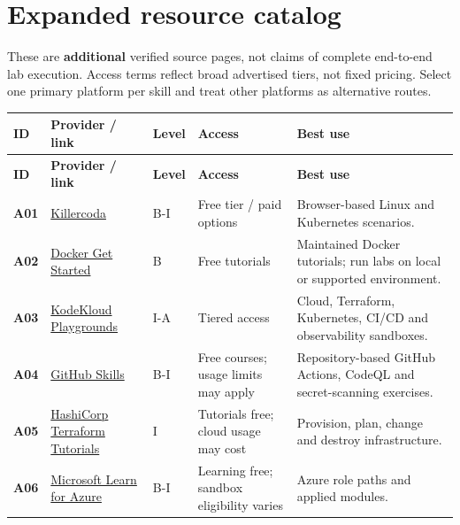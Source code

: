 \documentclass[10pt,letterpaper,oneside]{article}
\begin{document}
\section{Expanded resource catalog}
These are \textbf{additional} verified source pages, not claims of complete end-to-end lab execution. Access terms reflect broad advertised tiers, not fixed pricing. Select one primary platform per skill and treat other platforms as alternative routes.
\small
\begin{longtable}{@{}>{\raggedright\arraybackslash}p{\dimexpr 0.08671\dimexpr\linewidth-8\tabcolsep\relax\relax}>{\raggedright\arraybackslash}p{\dimexpr 0.24855\dimexpr\linewidth-8\tabcolsep\relax\relax}>{\raggedright\arraybackslash}p{\dimexpr 0.09827\dimexpr\linewidth-8\tabcolsep\relax\relax}>{\raggedright\arraybackslash}p{\dimexpr 0.16763\dimexpr\linewidth-8\tabcolsep\relax\relax}>{\raggedright\arraybackslash}p{\dimexpr 0.39884\dimexpr\linewidth-8\tabcolsep\relax\relax}@{}}
\toprule
\textbf{ID} & \textbf{Provider / link} & \textbf{Level} & \textbf{Access} & \textbf{Best use}\\\midrule\endfirsthead
\toprule\textbf{ID}&\textbf{Provider / link}&\textbf{Level}&\textbf{Access}&\textbf{Best use}\\\midrule\endhead
\bottomrule\endfoot
\textbf{A01} & \href{https://killercoda.com/}{Killercoda} & B-I & Free tier / paid options & Browser-based Linux and Kubernetes scenarios.\\
\addlinespace[2pt]
\textbf{A02} & \href{https://docs.docker.com/get-started/tutorials/run-an-app/}{Docker Get Started} & B & Free tutorials & Maintained Docker tutorials; run labs on local or supported environment.\\
\addlinespace[2pt]
\textbf{A03} & \href{https://kodekloud.com/playgrounds}{KodeKloud Playgrounds} & I-A & Tiered access & Cloud, Terraform, Kubernetes, CI/CD and observability sandboxes.\\
\addlinespace[2pt]
\textbf{A04} & \href{https://learn.github.com/skills}{GitHub Skills} & B-I & Free courses; usage limits may apply & Repository-based GitHub Actions, CodeQL and secret-scanning exercises.\\
\addlinespace[2pt]
\textbf{A05} & \href{https://developer.hashicorp.com/terraform/tutorials}{HashiCorp Terraform Tutorials} & I & Tutorials free; cloud usage may cost & Provision, plan, change and destroy infrastructure.\\
\addlinespace[2pt]
\textbf{A06} & \href{https://learn.microsoft.com/en-us/training/azure/}{Microsoft Learn for Azure} & B-I & Learning free; sandbox eligibility varies & Azure role paths and applied modules.\\

\end{longtable}
\end{document}
